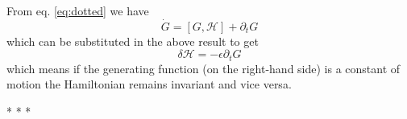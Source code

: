 \documentclass[english,seminar,headertitle]{lecture}
\newcommand{\ham}{\mathscr{H}}
\begin{document}
From eq. \eqref{eq:dotted} we have
$$
\dot{G} = [G,\ham] + \partial_t G
$$
which can be substituted in the above result to get
\begin{equation}
	\delta \ham = - \epsilon \partial_t G
\end{equation}
which means if the generating function (on the right-hand side) is a constant of motion the Hamiltonian remains invariant and vice versa.

\vspace*{1.5cm}
{\centering
* \; * \; *

}
\end{document}
